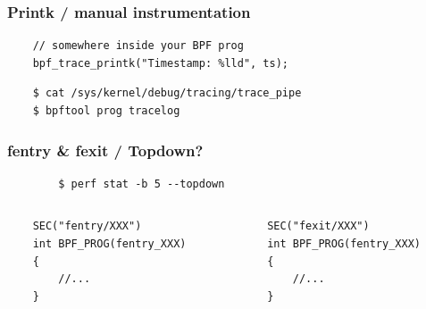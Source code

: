 \documentclass[usenames,dvipsnames, 18pt, compress, aspectratio=169]{beamer}
\begin{document}
\begin{frame}[fragile]{}
    \frametitle{Printk / manual instrumentation}

    \begin{center}
        \begin{verbatim}
    // somewhere inside your BPF prog
    bpf_trace_printk("Timestamp: %lld", ts);
        \end{verbatim}
        \vspace{0.5cm}
        \begin{verbatim}
    $ cat /sys/kernel/debug/tracing/trace_pipe
    $ bpftool prog tracelog
        \end{verbatim}
    \end{center}
\end{frame}

\begin{frame}[fragile]{}
    \frametitle{fentry \& fexit / Topdown?}

    \begin{center}
        \begin{verbatim}
        $ perf stat -b 5 --topdown
        \end{verbatim}

        \vspace{0.5cm}

        \begin{columns}
            \begin{column}{0.5\textwidth}
                \begin{verbatim}
    SEC("fentry/XXX")
    int BPF_PROG(fentry_XXX)
    {
        //...
    }
               \end{verbatim}
           \end{column}

           \begin{column}{0.5\textwidth}
               \begin{verbatim}
    SEC("fexit/XXX")
    int BPF_PROG(fentry_XXX)
    {
        //...
    }
                \end{verbatim}
            \end{column}
        \end{columns}
    \end{center}
\end{frame}
\end{document}
